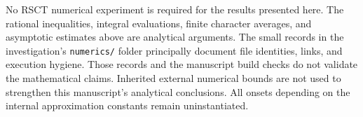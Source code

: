 No RSCT numerical experiment is required for the results presented here.
The rational inequalities, integral evaluations, finite character
averages, and asymptotic estimates above are analytical arguments.
The small records in the investigation's \texttt{numerics/} folder
principally document file identities, links, and execution hygiene.
Those records and the manuscript build checks do not validate the
mathematical claims. Inherited external numerical bounds are not used
to strengthen this manuscript's analytical conclusions. All onsets
depending on the internal approximation constants remain uninstantiated.
